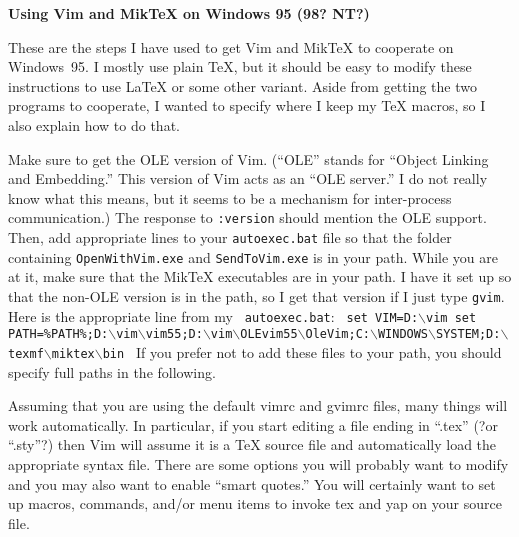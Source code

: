 
\def\topic#1{\medskip\noindent{\bf #1}}
\def\\{\hbox{$\backslash$}}
\def\cite{\smallskip\tt\obeylines\parindent0pt}

\nopagenumbers

\centerline{\bf Using Vim and MikTeX on Windows 95 (98? NT?)}
\bigskip

These are the steps I have used to get Vim and Mik\TeX{} to cooperate on
Windows~95.  I mostly use plain \TeX{}, but it should be easy to modify
these instructions to use La\TeX{} or some other variant.  Aside from
getting the two programs to cooperate, I wanted to specify where I keep
my \TeX{} macros, so I also explain how to do that.

Make sure to get the OLE version of Vim.  (``OLE'' stands for ``Object
Linking and Embedding.''  This version of Vim acts as an ``OLE server.''
I do not really know what this means, but it seems to be a mechanism for
inter-process communication.)
The response to
{\tt :version}
should mention the OLE support.
Then, add appropriate lines to your
{\tt autoexec.bat}
file so that the folder containing {\tt OpenWithVim.exe} and
{\tt SendToVim.exe} is in your path.  While you are at it, make sure
that the Mik\TeX{} executables are in your path.  I have it set up so
that the non-OLE version is in the path, so I get that version if I just
type {\tt gvim}.  Here is the appropriate line from my {\tt
autoexec.bat}:
{\cite
set VIM=D:\\vim
set PATH=\%PATH\%;D:\\vim\\vim55;D:\\vim\\OLEvim55\\OleVim;C:\\WINDOWS\\SYSTEM;D:\\texmf\\miktex\\bin
\smallskip}
If you prefer not to add these files to your path, you should specify
full paths in the following.

\topic{Setting up Vim:}
Assuming that you are using the default vimrc and gvimrc files, many
things will work automatically.  In particular, if you start editing a
file ending in ``.tex'' (?or ``.sty''?) then Vim will assume it is a
\TeX{} source file and automatically load the appropriate syntax file.
There are some options you will probably want to modify and you may also
want to enable ``smart quotes.''  You will certainly want to set up
macros, commands, and/or menu items to invoke tex and yap on your source
file.

